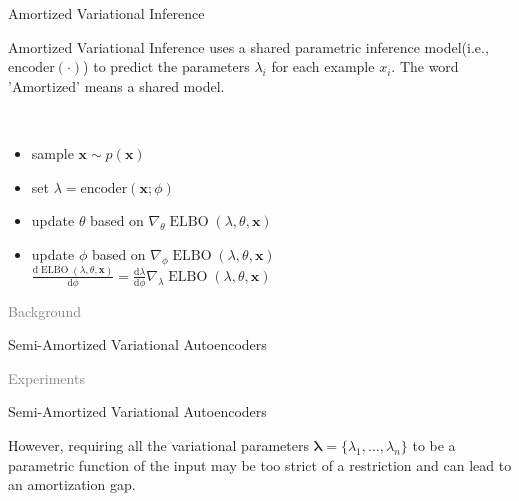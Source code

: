 \documentclass{beamer}		%
\newcommand{\light}[1]{\textcolor{gray}{#1}}
\newcommand{\dd}{\mathrm{d}}
\DeclareMathOperator*{\ELBO}{ELBO}
\begin{document}
\begin{frame}{Amortized Variational Inference}

Amortized Variational Inference uses a shared parametric inference model(i.e., $\text{encoder}(\cdot)$) to predict the  parameters $\lambda_i$ for each example $x_i$.
The word 'Amortized' means a shared model.

~\\
\begin{itemize}
    \item sample $\bm{x}\sim p(\bm{x})$
    \item set $\lambda = \text{encoder}(\bm{x};\phi)$
    \item update $\theta$ based on $\nabla_{\theta} \ELBO(\lambda, \theta, \bm{x})$
    \item update $\phi$ based on $\nabla_{\phi} \ELBO(\lambda, \theta, \bm{x})$ \\ $\frac{\dd \ELBO(\lambda, \theta, \bm{x})}{\dd \phi} = \frac{\dd \lambda}{\dd \phi} \nabla_\lambda \ELBO(\lambda, \theta, \bm{x})$
\end{itemize}
    
\end{frame}



\begin{frame}[noframenumbering]
\begin{itemize}
    \begin{LARGE}
    \item \light{Background}
    \item Semi-Amortized Variational Autoencoders
    \item \light{Experiments}
    \end{LARGE}
\end{itemize}
\end{frame}



\begin{frame}{Semi-Amortized Variational Autoencoders}

However, requiring all the variational parameters $\bm{\lambda} = \{\lambda_1, \ldots, \lambda_n\}$ to be a parametric function of the input may be too strict of a restriction and can lead to an amortization gap.
    
\end{frame}
\end{document}
